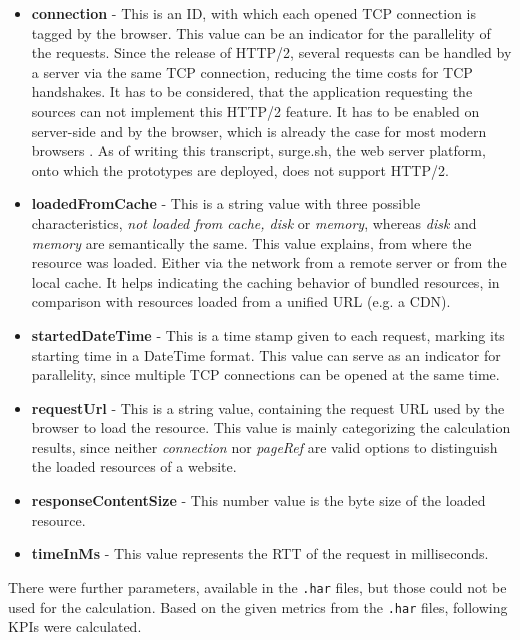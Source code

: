 \begin{itemize}
	\item \textbf{connection} - This is an ID, with which each opened TCP connection is tagged by the browser. This value can be an indicator for the parallelity of the requests. Since the release of HTTP/2, several requests can be handled by a server via the same TCP connection, reducing the time costs for TCP handshakes. It has to be considered, that the application requesting the sources can not implement this HTTP/2 feature. It has to be enabled on server-side and by the browser, which is already the case for most modern browsers \cite{http2}. As of writing this transcript, surge.sh, the web server platform, onto which the prototypes are deployed, does not support HTTP/2.
	
	\item \textbf{loadedFromCache} - This is a string value with three possible characteristics, \textit{not loaded from cache, disk} or \textit{memory}, whereas \textit{disk} and \textit{memory} are semantically the same. This value explains, from where the resource was loaded. Either via the network from a remote server or from the local cache. It helps indicating the caching behavior of bundled resources, in comparison with resources loaded from a unified URL (e.g. a CDN). 
	
	\item \textbf{startedDateTime} - This is a time stamp given to each request, marking its starting time in a DateTime format. This value can serve as an indicator for parallelity, since multiple TCP connections can be opened at the same time. 
		
	\item \textbf{requestUrl} - This is a string value, containing the request URL used by the browser to load the resource. This value is mainly categorizing the calculation results, since neither \textit{connection} nor \textit{pageRef} are valid options to distinguish the loaded resources of a website. 
			
	\item \textbf{responseContentSize} - This number value is the byte size of the loaded resource.
	
	\item \textbf{timeInMs} - This value represents the RTT of the request in milliseconds. 
\end{itemize}

There were further parameters, available in the \texttt{.har} files, but those could not be used for the calculation. 
Based on the given metrics from the \texttt{.har} files, following KPIs were calculated.

